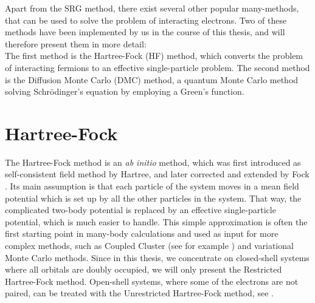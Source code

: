 Apart from the SRG method, there exist several other popular many-methods, that can be used to solve the problem of interacting electrons. Two of these methods have been implemented by us in the course of this thesis, and will therefore present them in more detail:\\
The first method is the Hartree-Fock (HF) method, which converts the problem of interacting fermions to an effective single-particle problem. The second method is the Diffusion Monte Carlo (DMC) method, a quantum Monte Carlo method solving Schr\"odinger's equation by employing a Green's function.

\section{Hartree-Fock}
\label{sec:HF}
The Hartree-Fock method is an \textit{ab initio} method, which was first introduced as self-consistent field method by Hartree, and later corrected and extended by Fock \cite{thijssen2007computational}. Its main assumption is that each particle of the system moves in a mean field potential which is set up by all the other particles in the system. That way, the complicated two-body potential is replaced by an effective single-particle potential, which is much easier to handle. This simple approximation is often the first starting point in many-body calculations and used as input for more complex methods, such as Coupled Cluster (see for example \cite{PhysRevB.84.115302}) and variational Monte Carlo methods. Since in this thesis, we concentrate on closed-shell systems where all orbitals are doubly occupied, we will only present the Restricted Hartree-Fock method. Open-shell systems, where some of the electrons are not paired, can be treated with the Unrestricted Hartree-Fock method, see \cite{thijssen2007computational}.

